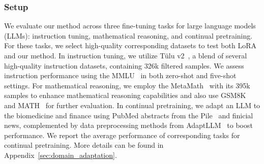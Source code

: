 \documentclass[11pt]{article}
\begin{document}
\subsubsection{Setup}
We evaluate our method across three fine-tuning tasks for large language models (LLMs): instruction tuning, mathematical reasoning, and continual pretraining.
For these tasks, we select high-quality corresponding datasets to test both LoRA and our method.
In instruction tuning, we utilize Tülu v2~\cite{ivison2023camels}, a blend of several high-quality instruction datasets, containing 326k filtered samples. We assess instruction performance using the MMLU~\cite{hendrycks2020measuring} in both zero-shot and five-shot settings. For mathematical reasoning, we employ the MetaMath~\cite{yu2023metamath} with its 395k samples to enhance mathematical reasoning capabilities and also use GSM8K~\cite{cobbe2021training} and MATH~\cite{hendrycks2021measuring} for further evaluation. In continual pretraining, we adapt an LLM to the biomedicine and finance using PubMed abstracts from the Pile~\cite{gao2020pile} and finicial news, complemented by data preprocessing methods from AdaptLLM~\cite{cheng2023adapting} to boost performance. We report the average performance of corresponding tasks for continual pretraining. More details can be found in Appendix~\ref{sec:domain_adaptation}.

\end{document}
